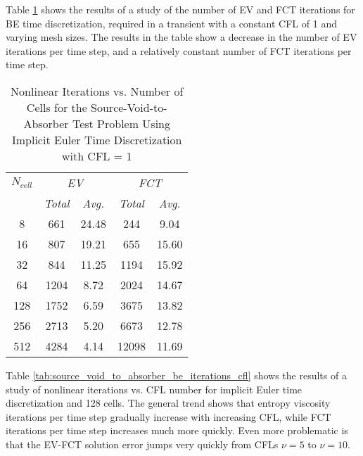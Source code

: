 Table \ref{tab:source_void_to_absorber_be_iterations_cells} shows the
results of a study of the number of EV and FCT iterations for
BE time discretization, required in
a transient with a constant CFL of 1 and varying mesh sizes. The
results in the table show a decrease in the number of EV iterations
per time step, and a relatively constant number of FCT iterations per
time step.

\begin{table}[ht]
\caption{Nonlinear Iterations vs. Number of Cells for the
  Source-Void-to-Absorber Test Problem Using Implicit Euler Time Discretization
  with CFL = 1}
\label{tab:source_void_to_absorber_be_iterations_cells}
\centering
\begin{tabular}{c c c c c}\toprule
$N_{cell}$ & \multicolumn{2}{c}{\emph{EV}} & \multicolumn{2}{c}{\emph{FCT}}\\
           & \emph{Total} & \emph{Avg.}    &  \emph{Total} & \emph{Avg.}\\\midrule
  8 &  661 & 24.48 &   244 &  9.04\\
 16 &  807 & 19.21 &   655 & 15.60\\
 32 &  844 & 11.25 &  1194 & 15.92\\
 64 & 1204 &  8.72 &  2024 & 14.67\\
128 & 1752 &  6.59 &  3675 & 13.82\\
256 & 2713 &  5.20 &  6673 & 12.78\\
512 & 4284 &  4.14 & 12098 & 11.69\\
\bottomrule\end{tabular}
\end{table}

Table \ref{tab:source_void_to_absorber_be_iterations_cfl} shows
the results of a study of nonlinear iterations vs. CFL number for
implicit Euler time discretization and 128 cells. The general
trend shows that entropy viscosity iterations per time step gradually increase
with increasing CFL, while FCT iterations per time step increases
much more quickly. Even more problematic is that the EV-FCT solution
error jumps very quickly from CFLs $\nu=5$ to $\nu=10$.

